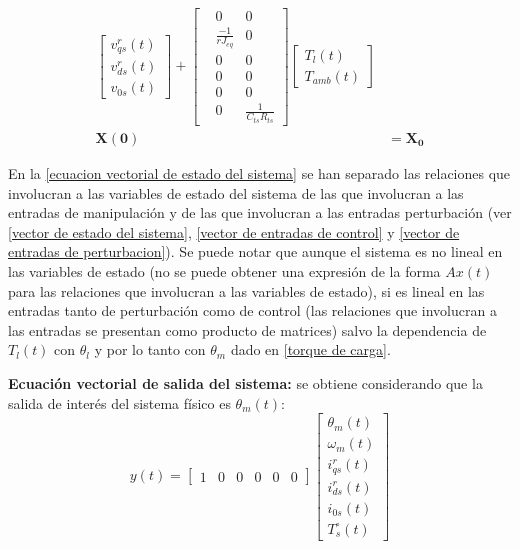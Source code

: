 \documentclass[a4paper, 10pt, onecolumn,journal]{ieeeconf}
\begin{document}
\begin{equation}
\begin{aligned}
        \begin{bmatrix} 
        v^r_{qs}(t) \\ 
        v^r_{ds}(t) \\ 
        v_{0s}(t)
        \end{bmatrix}
        + 
        \begin{bmatrix} 
        & 0 & 0 \\
        & \frac{-1}{r J_{eq}} & 0 \\
        & 0 & 0 \\
        & 0 & 0 \\
        & 0 & 0 \\
        & 0 & \frac{1}{C_{ts} R_{ts}}
        \end{bmatrix}
        \begin{bmatrix} 
        T_l(t) \\ 
        T_{amb}(t) 
        \end{bmatrix}\\
        \mathbf{X(0)} \quad&= \mathbf{X_0}
    \end{aligned}
    \label{ecuacion vectorial de estado del sistema}
\end{equation}



En la \cref{ecuacion vectorial de estado del sistema} se han separado
las relaciones que involucran a las variables de estado del sistema de las que involucran a las 
entradas de manipulación y de las que involucran a las entradas perturbación (ver \cref{vector de estado del sistema}, \cref{vector de entradas de control} y \cref{vector de entradas de perturbacion}). Se puede notar
que aunque el sistema es no lineal en las variables de estado (no se puede obtener una expresión de la forma $Ax(t)$ para las relaciones que involucran a las variables de estado), 
si es lineal en las entradas tanto de perturbación como de control (las relaciones que involucran a las entradas se presentan como producto de matrices) salvo la dependencia de $T_l(t)$ con $\theta_l$ y por lo tanto con $\theta_m$ 
dado en \cref{torque de carga}.

\textbf{Ecuación vectorial de salida del sistema:} se obtiene considerando que la salida de interés del sistema físico es $\theta_m(t)$:
\begin{equation}
    y(t) = 
    \begin{bmatrix}
        1 & 0 & 0 & 0 & 0 & 0
    \end{bmatrix}
    \begin{bmatrix} \theta_m(t) \\ \omega_m(t) \\ i^r_{qs}(t) \\ i^r_{ds}(t) \\ i_{0s}(t) \\ T^\circ_s(t) \end{bmatrix}
    \label{ecuacion vectorial de salida del sistema}
\end{equation}
\end{document}
